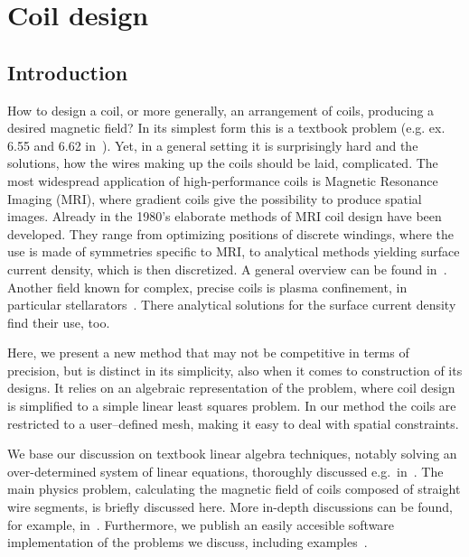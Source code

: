 \chapter{Coil design} %
\label{ch:coil_design}

\section{Introduction}
How to design a coil, or more generally, an arrangement of coils, producing a desired magnetic field? In its simplest form this is a textbook problem (e.g. ex. 6.55 and 6.62 in~\cite{Purcell}). Yet, in a general setting it is surprisingly hard and the solutions, how the wires making up the coils should be laid, complicated. The most widespread application of high-performance coils is Magnetic Resonance Imaging (MRI), where gradient coils give the possibility to produce spatial images. Already in the 1980's elaborate methods of MRI coil design have been developed. They range from optimizing positions of discrete windings, where the use is made of symmetries specific to MRI, to analytical methods yielding surface current density, which is then discretized. A general overview can be found in~\cite{Turner1993}. Another field known for complex, precise coils is plasma confinement, in particular stellarators~\cite{Beidler1990}. There analytical solutions for the surface current density find their use, too.


Here, we present a new method that may not be competitive in terms of precision, but is distinct in its simplicity, also when it comes to construction of its designs. It relies on an algebraic representation of the problem, where coil design is simplified to a simple linear least squares problem. In our method the coils are restricted to a user--defined mesh, making it easy to deal with spatial constraints.

We base our discussion on textbook linear algebra techniques, notably solving an over-determined system of linear equations, thoroughly discussed e.g.\ in~\cite{Anton}. The main physics problem, calculating the magnetic field of coils composed of straight wire segments, is briefly discussed here. More in-depth discussions can be found, for example, in~\cite{Griffith}. Furthermore, we publish an easily accesible software implementation of the problems we discuss, including examples~\cite{Coilsjlcode}.

